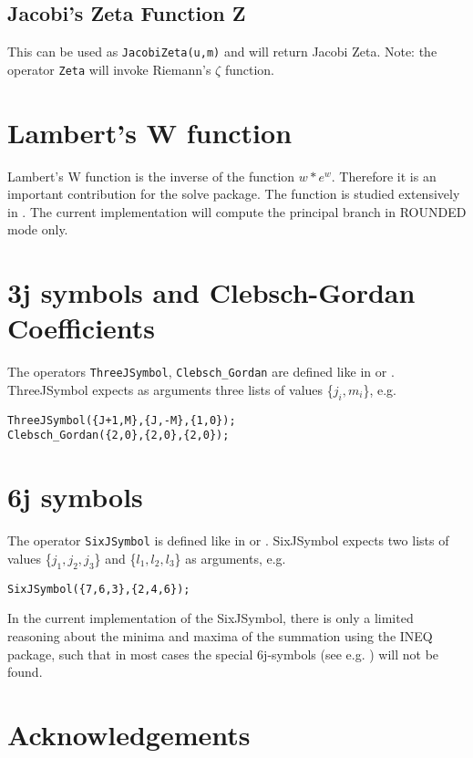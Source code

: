 \subsection{Jacobi's Zeta Function Z }

This can be used as {\tt JacobiZeta(u,m)} and will return
Jacobi Zeta. Note: the operator {\tt Zeta} will invoke Riemann's
$\zeta$ function.

\section{Lambert's W function}

Lambert's W function is the inverse of the function  $w*e^w$.
Therefore it is an important contribution for the solve package.
The function is studied extensively in \cite{Corless:92}.
The current implementation will compute the principal branch in
ROUNDED mode only.

\section{3j symbols and Clebsch-Gordan Coefficients}
The operators {\tt ThreeJSymbol}, {\tt Clebsch\_Gordan} are defined like
in \cite{Landolt:68} or \cite{Edmonds:57}. ThreeJSymbol expects as arguments
three lists of values \{$j_i,m_i$\}, e.g.

\begin{verbatim}
ThreeJSymbol({J+1,M},{J,-M},{1,0});
Clebsch_Gordan({2,0},{2,0},{2,0});
\end{verbatim}

\section{6j symbols }
The operator {\tt SixJSymbol} is defined like
in \cite{Landolt:68} or \cite{Edmonds:57}.
SixJSymbol expects two lists of values \{$j_1,j_2,j_3$\} and
 \{$l_1,l_2,l_3$\} as arguments, e.g.

\begin{verbatim}
SixJSymbol({7,6,3},{2,4,6});
\end{verbatim}

In the current implementation of the SixJSymbol, there is only a limited
reasoning about the minima and maxima of the summation using
the INEQ package, such that in most
cases the special 6j-symbols (see e.g. \cite{Landolt:68})
will not be found.



\section{Acknowledgements}

